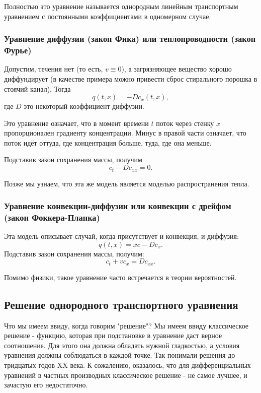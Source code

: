Полностью это уравнение называется однородным линейным транспортным уравнением с постоянными коэффициентами в одномерном случае.

\subsubsection*{Уравнение диффузии (закон Фика) или теплопроводности (закон Фурье)}

Допустим, течения нет (то есть, $ v \equiv 0 $), а загрязняющее вещество хорошо диффундирует (в качестве примера можно привести сброс стирального порошка в стоячий канал). Тогда
$$q (t, x) = - D c_x (t, x),$$
где $D$ это некоторый коэффициент диффузии.

Это уравнение означает, что в момент времени $t$ поток через стенку $x$ пропорционален градиенту концентрации. Минус в правой части означает, что поток идёт оттуда, где концентрация больше, туда, где она меньше.

Подставив закон сохранения массы, получим
\begin{equation}
    c_t - Dc_{xx} = 0.
\end{equation}

Позже мы узнаем, что эта же модель является моделью распространения тепла.

\subsubsection*{Уравнение конвекции-диффузии или конвекции с дрейфом (закон Фоккера-Планка)}
Эта модель описывает случай, когда присутствует и конвекция, и диффузия:
$$ q (t, x)  = x c - D c_x. $$
Подставив закон сохранения массы, получим:
\begin{equation}
    c_t + vc_x = D c_{xx}.
\end{equation}

Помимо физики, такое уравнение часто встречается в теории вероятностей.

\subsection{Решение однородного транспортного уравнения}
Что мы имеем ввиду, когда говорим "решение"? Мы имеем ввиду классическое решение - функцию, которая при подстановке в уравнение даст верное соотношение. Для этого она должна обладать нужной гладкостью, а условия уравнения должны соблюдаться в каждой точке. Так понимали решения до тридцатых годов XX века. К сожалению, оказалось, что для дифференциальных уравнений в частных производных классическое решение - не самое лучшее, и зачастую его недостаточно.

